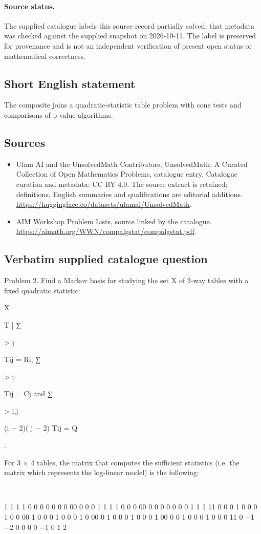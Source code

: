 \documentclass[11pt]{article}
\begin{document}
\paragraph{Source status.}
The supplied catalogue labels this source record partially solved; that metadata was checked against the supplied snapshot on 2026-10-11. The label is preserved for provenance and is not an independent verification of present open status or mathematical correctness.
\subsection{Short English statement}
The composite joins a quadratic-statistic table problem with cone tests and comparisons of p-value algorithms.
\subsection{Sources}
\begin{itemize}
\item[S1] Ulam AI and the UnsolvedMath Contributors, UnsolvedMath: A Curated Collection of Open Mathematics Problems, catalogue entry. Catalogue curation and metadata: CC BY 4.0. The source extract is retained; definitions, English summaries and qualifications are editorial additions.
\url{https://huggingface.co/datasets/ulamai/UnsolvedMath}.
\item[S2] AIM Workshop Problem Lists, source linked by the catalogue.
\url{https://aimath.org/WWN/compalgstat/compalgstat.pdf}.
\end{itemize}
\subsection{Verbatim supplied catalogue question}
Problem 2. Find a Markov basis for studying the set X of 2-way tables with a fixed quadratic statistic:

X = {T | ∑

> j

Tij = Ri, ∑

> i

Tij = Cj and ∑

> i,j

(i − 2)( j − 2) Tij = Q}.

For 3 × 4 tables, the matrix that computes the sufficient statistics (i.e. the matrix which represents the log-linear model) is the following:



1 1 1 1 0 0 0 0 0 0 0 00 0 0 0 1 1 1 1 0 0 0 00 0 0 0 0 0 0 0 1 1 1 11 0 0 0 1 0 0 0 1 0 0 00 1 0 0 0 1 0 0 0 1 0 00 0 1 0 0 0 1 0 0 0 1 00 0 0 1 0 0 0 1 0 0 0 11 0 −1 −2 0 0 0 0 −1 0 1 2
\end{document}
